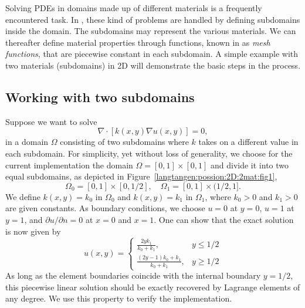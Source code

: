 Solving PDEs in domains made up of different materials is a frequently
encountered task. In \fenics, these kind of problems are handled by
defining subdomains inside the domain. The subdomains may represent
the various materials. We can thereafter define material properties
through functions, known in \fenics{} as \emph{mesh functions}, that are
piecewise constant in each subdomain.  A simple example with two materials
(subdomains) in 2D will demonstrate the basic steps in the process.

\subsection{Working with two subdomains}
\label{langtangen:possion:2D:2mat:problem}

Suppose we want to solve
\begin{equation} \label{langtangen:poisson:2D:2mat:varcoeff2}
  \nabla\cdot \left\lbrack k(x,y)\nabla u(x,y)\right\rbrack = 0,
\end{equation}
in a domain $\Omega$ consisting of two subdomains where $k$ takes on
a different value in each subdomain.
For simplicity, yet without loss of generality, we choose for the current
implementation
the domain $\Omega = [0,1]\times [0,1]$ and divide it into two equal
subdomains, as depicted in Figure~\ref{langtangen:possion:2D:2mat:fig1},
\begin{equation}
 \Omega_0 = [0, 1]\times [0,1/2],\quad \Omega_1 = [0, 1]\times (1/2,1].
\end{equation}
We define $k(x,y)=k_0$ in $\Omega_0$ and $k(x,y)=k_1$ in $\Omega_1$,
where $k_0>0$ and $k_1>0$ are given constants.  As boundary conditions,
we choose $u=0$ at $y=0$, $u=1$ at $y=1$, and $\partial u/\partial n=0$
at $x=0$ and $x=1$.  One can show that the exact solution is now given by
\begin{equation}
u(x, y) = \left\lbrace\begin{array}{ll}
\frac{2yk_1}{k_0+k_1}, & y \leqslant 1/2\\
\frac{(2y-1)k_0 + k_1}{k_0+k_1}, & y \geqslant 1/2
\end{array}\right.
\end{equation}
As long as the element boundaries coincide with the internal boundary
$y=1/2$, this piecewise linear solution should be exactly recovered
by Lagrange elements of any degree. We use this property to verify the
implementation.


